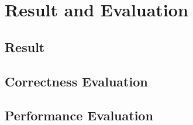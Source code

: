 \section{Result and Evaluation} \label{sec:eval}
\subsection{Result}
\subsection{Correctness Evaluation}
\subsection{Performance Evaluation}